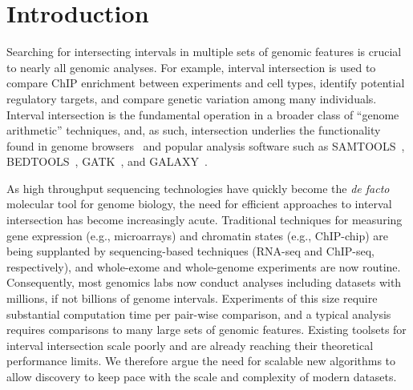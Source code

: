 \documentclass{bioinfo}
\begin{document}
	\section{Introduction}

	Searching for intersecting intervals in multiple sets of genomic features is
	crucial to nearly all genomic analyses. For example, interval intersection is used
	to compare ChIP enrichment between experiments and cell types, identify potential
	regulatory targets, and compare genetic variation among many individuals.
	Interval intersection is the fundamental operation in a broader class of
	``genome arithmetic'' techniques, and, as such, intersection underlies the
	functionality found in genome browsers~\citep{kent2002,robinson2011} and popular
	analysis software such as SAMTOOLS~\citep{li2009}, BEDTOOLS~\citep{quinlan2010}, 
	GATK~\citep{mckenna2010}, and GALAXY~\citep{giardine2005}.

	As high throughput sequencing technologies have quickly become the \emph{de facto}
	molecular tool for genome biology, the need for efficient approaches 
	to interval intersection has become increasingly acute. Traditional techniques 
	for measuring gene expression (e.g., microarrays) and chromatin states (e.g., ChIP-chip) 
	are being supplanted by sequencing-based techniques (RNA-seq and ChIP-seq, respectively), and
	whole-exome and whole-genome experiments are now routine. Consequently, most
	genomics labs now conduct analyses including datasets with millions, if not billions 
	of genome intervals. Experiments of this size require substantial computation time per 
	pair-wise comparison, and a typical analysis requires comparisons to many large
	sets of genomic features. Existing toolsets for interval intersection scale poorly 
	and are already reaching their theoretical performance limits. We therefore argue the
	need for scalable new algorithms to allow discovery to keep pace with the scale and complexity of modern datasets.
\end{document}
